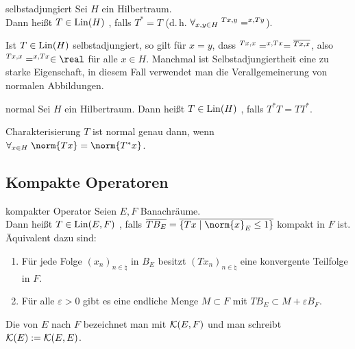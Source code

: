 \linie

\begin{Def}{selbstadjungiert}
    Sei $H$ ein Hilbertraum.\\
    Dann heißt $T \in \operatorname{Lin}(H)$ , falls $T^\ast = T$
    (d.\,h. $\forall_{x, y \in H}\; \sp{Tx, y} = \sp{x, Ty}$).
\end{Def}

\begin{Bem}
    Ist $T \in \operatorname{Lin}(H)$ selbstadjungiert, so gilt für $x = y$, dass
    $\sp{Tx, x} = \sp{x, Tx} = \overline{\sp{Tx, x}}$,
    also $\sp{Tx, x} = \sp{x, Tx} \in \real$ für alle $x \in H$.
    Manchmal ist Selbstadjungiertheit eine zu starke Eigenschaft,
    in diesem Fall verwendet man die Verallgemeinerung von normalen Abbildungen.
\end{Bem}

\begin{Def}{normal}
    Sei $H$ ein Hilbertraum.
    Dann heißt $T \in \operatorname{Lin}(H)$ , falls $T^\ast T = TT^\ast$.
\end{Def}

\begin{Lemma}{Charakterisierung}
    $T$ ist normal genau dann, wenn
    $\forall_{x \in H}\; \norm{Tx} = \norm{T^\ast x}$.
\end{Lemma}

\pagebreak

\subsection{%
    Kompakte Operatoren%
}

\begin{Def}{kompakter Operator}
    Seien $E, F$ Banachräume.\\
    Dann heißt $T \in \operatorname{Lin}(E, F)$ , falls
    $\overline{T B_E} = \overline{\{Tx \;|\; \norm{x}_E \le 1\}}$ kompakt in $F$ ist.\\
    Äquivalent dazu sind:
    \begin{enumerate}
        \item
        Für jede Folge $(x_n)_{n \in \natural}$ in $B_E$ besitzt $(Tx_n)_{n \in \natural}$
        eine konvergente Teilfolge in $F$.
        
        \item
        Für alle $\varepsilon > 0$ gibt es eine endliche Menge $M \subset F$ mit
        $TB_E \subset M + \varepsilon B_F$.
    \end{enumerate}
    Die  von $E$ nach $F$ bezeichnet man mit
    $\mathcal{K}(E, F)$ und man schreibt $\mathcal{K}(E) := \mathcal{K}(E, E)$.
\end{Def}

